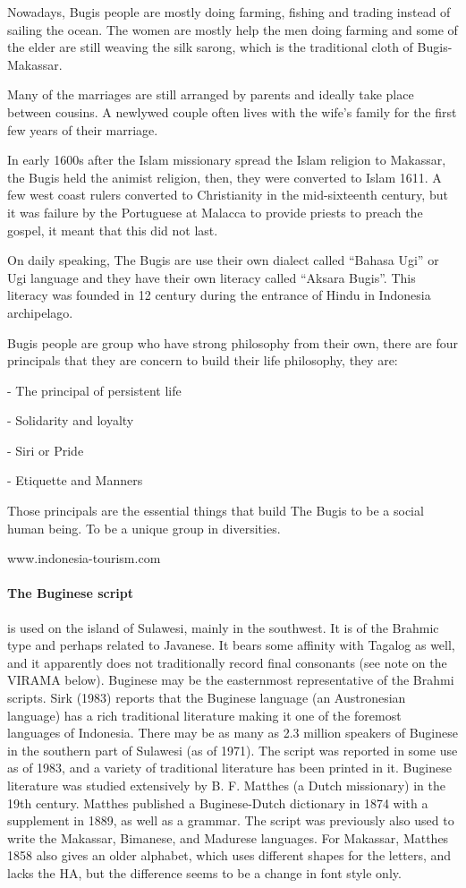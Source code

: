 Nowadays, Bugis people are mostly doing farming, fishing and trading instead of sailing the ocean. The women are mostly help the men doing farming and some of the elder are still weaving the silk sarong, which is the traditional cloth of Bugis-Makassar.

Many of the marriages are still arranged by parents and ideally take place between cousins. A newlywed couple often lives with the wife’s family for the first few years of their marriage.

In early 1600s after the Islam missionary spread the Islam religion to Makassar, the Bugis held the animist religion, then, they were converted to Islam 1611. A few west coast rulers converted to Christianity in the mid-sixteenth century, but it was failure by the Portuguese at Malacca to provide priests to preach the gospel, it meant that this did not last.

On daily speaking, The Bugis are use their own dialect called “Bahasa Ugi” or Ugi language and they have their own literacy called “Aksara Bugis”. This literacy was founded in 12 century during the entrance of Hindu in Indonesia archipelago.

Bugis people are group who have strong philosophy from their own, there are four principals that they are concern to build their life philosophy, they are:

- The principal of persistent life

- Solidarity and loyalty

- Siri or Pride

- Etiquette and Manners



Those principals are the essential things that build The Bugis to be a social human being. To be a unique group in diversities.

www.indonesia-tourism.com

\paragraph{The Buginese script} is used on the island of Sulawesi, mainly in the southwest. It is of the Brahmic type
and perhaps related to Javanese. It bears some affinity with Tagalog as well, and it apparently does not
traditionally record final consonants (see note on the VIRAMA below). Buginese may be the easternmost
representative of the Brahmi scripts. Sirk (1983) reports that the Buginese language (an Austronesian
language) has a rich traditional literature making it one of the foremost languages of Indonesia. There
may be as many as 2.3 million speakers of Buginese in the southern part of Sulawesi (as of 1971). The
script was reported in some use as of 1983, and a variety of traditional literature has been printed in it.
Buginese literature was studied extensively by B. F. Matthes (a Dutch missionary) in the 19th century.
Matthes published a Buginese-Dutch dictionary in 1874 with a supplement in 1889, as well as a
grammar. The script was previously also used to write the Makassar, Bimanese, and Madurese languages.
For Makassar, Matthes 1858 also gives an older alphabet, which uses different shapes for the letters, and
lacks the HA, but the difference seems to be a change in font style only.


